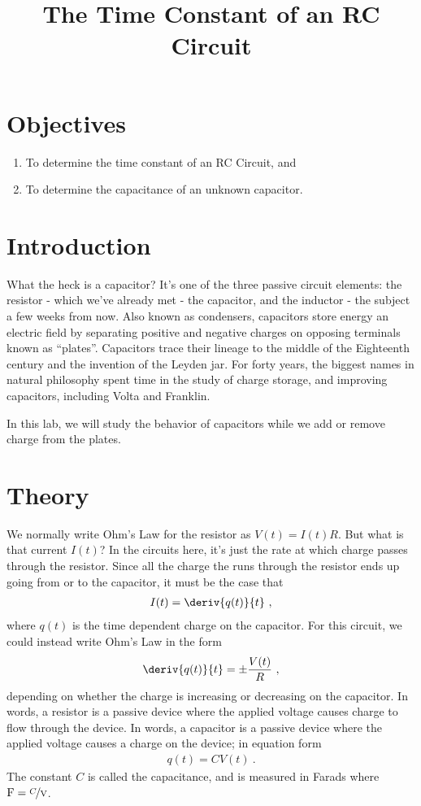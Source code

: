 \documentclass[12pt]{article}
\title{The Time Constant of an RC Circuit}
\author{}
\date{}
\begin{document}
\maketitle

\section{Objectives}
\label{sec:objectives}

\begin{enumerate}
\item To determine the time constant of an RC Circuit, and
\item To determine the capacitance of an unknown capacitor.
\end{enumerate}

\section{Introduction}
\label{sec:introduction}

What the heck is a capacitor?  It's one of the three passive circuit
elements: the resistor - which we've already met - the capacitor, and
the inductor - the subject a few weeks from now.  Also known as
condensers, capacitors store energy an electric field by separating
positive and negative charges on opposing terminals known as
``plates''.  Capacitors trace their lineage to the middle of the
Eighteenth century and the invention of the Leyden jar.  For forty
years, the biggest names in natural philosophy spent time in the study
of charge storage, and improving capacitors, including Volta and
Franklin.

In this lab, we will study the behavior of capacitors while we add or
remove charge from the plates.

\section{Theory}
\label{sec:theory}

We normally write Ohm's Law for the resistor as $V(t) = I(t) R$.  But
what is that current $I(t)$?  In the circuits here, it's just the rate
at which charge passes through the resistor.  Since all the charge the
runs through the resistor ends up going from or to the capacitor, it
must be the case that
\begin{gather*}
  I(t) = \deriv{q(t)}{t}\ ,
\end{gather*}
where $q(t)$ is the time dependent charge on the capacitor.  For this
circuit, we could instead write Ohm's Law in the form
\begin{gather*}
  \deriv{q(t)}{t} = \pm \frac{V(t)}{R}\ ,
\end{gather*}
depending on whether the charge is increasing or decreasing on the
capacitor.  In words, a resistor is a passive device where the applied
voltage causes charge to flow through the device.  In words, a
capacitor is a passive device where the applied voltage causes a
charge on the device; in equation form
\begin{gather*}
  q(t) = C V(t)\ .
\end{gather*}
The constant $C$ is called the capacitance, and is measured in Farads
where $\unit{F} = \unit{\nicefrac{C}{V}}$.
\end{document}
